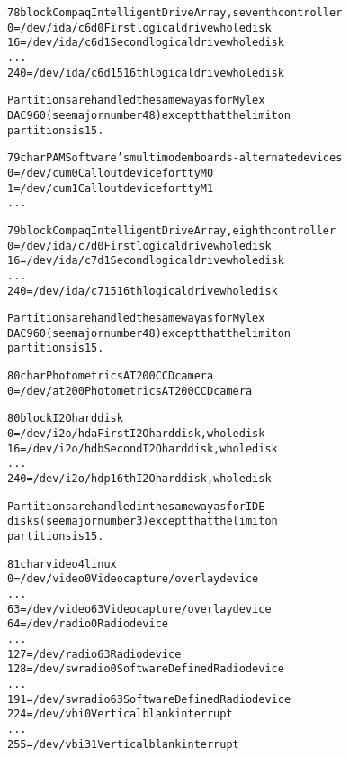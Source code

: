 \documentclass[a4paper,8pt,english]{sphinxmanual}
\begin{document}
\begin{alltt}
  78 block      Compaq Intelligent Drive Array, seventh controller
                  0 = /dev/ida/c6d0     First logical drive whole disk
                 16 = /dev/ida/c6d1     Second logical drive whole disk
                    ...
                240 = /dev/ida/c6d15    16th logical drive whole disk

                Partitions are handled the same way as for Mylex
                DAC960 (see major number 48) except that the limit on
                partitions is 15.

  79 char       PAM Software's multimodem boards - alternate devices
                  0 = /dev/cum0         Callout device for ttyM0
                  1 = /dev/cum1         Callout device for ttyM1
                    ...

  79 block      Compaq Intelligent Drive Array, eighth controller
                  0 = /dev/ida/c7d0     First logical drive whole disk
                 16 = /dev/ida/c7d1     Second logical drive whole disk
                    ...
                240 = /dev/ida/c715     16th logical drive whole disk

                Partitions are handled the same way as for Mylex
                DAC960 (see major number 48) except that the limit on
                partitions is 15.

  80 char       Photometrics AT200 CCD camera
                  0 = /dev/at200        Photometrics AT200 CCD camera

  80 block      I2O hard disk
                  0 = /dev/i2o/hda      First I2O hard disk, whole disk
                 16 = /dev/i2o/hdb      Second I2O hard disk, whole disk
                    ...
                240 = /dev/i2o/hdp      16th I2O hard disk, whole disk

                Partitions are handled in the same way as for IDE
                disks (see major number 3) except that the limit on
                partitions is 15.

  81 char       video4linux
                  0 = /dev/video0       Video capture/overlay device
                    ...
                 63 = /dev/video63      Video capture/overlay device
                 64 = /dev/radio0       Radio device
                    ...
                127 = /dev/radio63      Radio device
                128 = /dev/swradio0     Software Defined Radio device
                    ...
                191 = /dev/swradio63    Software Defined Radio device
                224 = /dev/vbi0         Vertical blank interrupt
                    ...
                255 = /dev/vbi31        Vertical blank interrupt


\end{alltt}
\end{document}
